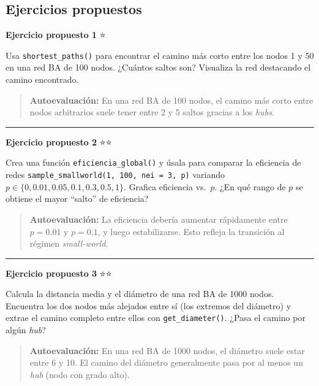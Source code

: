 \documentclass[
  letterpaper,
  DIV=11,
  numbers=noendperiod]{scrreprt}
\begin{document}
\subsection*{Ejercicios propuestos}\label{ejercicios-propuestos-2}

\textbf{Ejercicio propuesto 1} ⭐

Usa \texttt{shortest\_paths()} para encontrar el camino más corto entre
los nodos 1 y 50 en una red BA de 100 nodos. ¿Cuántos saltos son?
Visualiza la red destacando el camino encontrado.

\begin{quote}
\textbf{Autoevaluación:} En una red BA de 100 nodos, el camino más corto
entre nodos arbitrarios suele tener entre 2 y 5 saltos gracias a los
\emph{hubs}.
\end{quote}

\begin{center}\rule{0.5\linewidth}{0.5pt}\end{center}

\textbf{Ejercicio propuesto 2} ⭐⭐

Crea una función \texttt{eficiencia\_global()} y úsala para comparar la
eficiencia de redes \texttt{sample\_smallworld(1,\ 100,\ nei\ =\ 3,\ p)}
variando \(p \in \{0, 0.01, 0.05, 0.1, 0.3, 0.5, 1\}\). Grafica
eficiencia vs.~\(p\). ¿En qué rango de \(p\) se obtiene el mayor
``salto'' de eficiencia?

\begin{quote}
\textbf{Autoevaluación:} La eficiencia debería aumentar rápidamente
entre \(p = 0.01\) y \(p = 0.1\), y luego estabilizarse. Esto refleja la
transición al régimen \emph{small-world}.
\end{quote}

\begin{center}\rule{0.5\linewidth}{0.5pt}\end{center}

\textbf{Ejercicio propuesto 3} ⭐⭐

Calcula la distancia media y el diámetro de una red BA de 1000 nodos.
Encuentra los dos nodos más alejados entre sí (los extremos del
diámetro) y extrae el camino completo entre ellos con
\texttt{get\_diameter()}. ¿Pasa el camino por algún \emph{hub}?

\begin{quote}
\textbf{Autoevaluación:} En una red BA de 1000 nodos, el diámetro suele
estar entre 6 y 10. El camino del diámetro generalmente pasa por al
menos un \emph{hub} (nodo con grado alto).
\end{quote}
\end{document}
